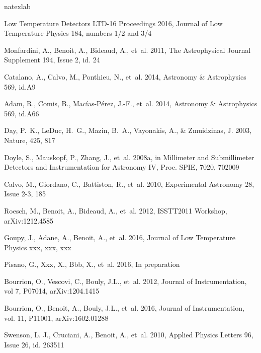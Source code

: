 \documentclass[]{aa} %
\begin{document}
\begin{thebibliography}{16}
\expandafter\ifx\csname natexlab\endcsname\relax\def\natexlab#1{#1}\fi

Low Temperature Detectors LTD-16 Proceedings 2016,  Journal of Low
  Temperature Physics 184, numbers 1/2 and 3/4

Monfardini, A., Benoit, A., Bideaud, A., {et~al.} 2011, 
The Astrophysical Journal Supplement 194, Issue 2, id. 24

Catalano, A., Calvo, M., Ponthieu, N., {et~al.} 2014, 
Astronomy \& Astrophysics 569, id.A9

Adam, R., Comis, B., Mac\'ias-P\'erez, J.-F., {et~al.} 2014, 
Astronomy \& Astrophysics 569, id.A66

Day, P.~K., LeDuc, H.~G., Mazin, B.~A., Vayonakis, A., \& Zmuidzinas, J. 2003,
  Nature, 425, 817

Doyle, S., Mauskopf, P., Zhang, J., {et~al.} 2008{\natexlab{a}}, in Millimeter
  and Submillimeter Detectors and Instrumentation for Astronomy IV, Proc. SPIE,
  7020, 702009

Calvo, M., Giordano, C., Battiston, R., {et~al.} 2010, 
Experimental Astronomy 28, Issue 2-3, 185

Roesch, M., Benoit, A., Bideaud, A., {et~al.} 2012, 
ISSTT2011 Workshop, arXiv:1212.4585

Goupy, J., Adane, A., Benoit, A., {et~al.} 2016, 
Journal of Low Temperature Physics xxx, xxx, xxx

Pisano, G., Xxx, X., Bbb, X., {et~al.} 2016, 
In preparation

Bourrion, O., Vescovi, C., Bouly, J.L., {et~al.} 2012, 
Journal of Instrumentation, vol 7, P07014, arXiv:1204.1415

Bourrion, O., Benoit, A., Bouly, J.L., {et~al.} 2016, 
Journal of Instrumentation, vol. 11, P11001, arXiv:1602.01288

Swenson, L. J., Cruciani, A., Benoit, A., {et~al.} 2010, 
Applied Physics Letters 96, Issue 26, id. 263511


\end{thebibliography}
\end{document}
